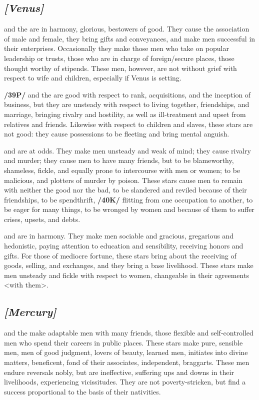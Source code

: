 \subsection{\textit{[Venus]}}
\Venus\xspace and the \Sun\xspace are in harmony, glorious, bestowers of good. They cause the association of male and female, they bring gifts and conveyances, and make men successful in their enterprises. Occasionally they make those men who take on popular leadership or trusts, those who are in charge of foreign/secure places, those thought worthy of stipends. These men, however, are not without grief with respect to wife and children, especially if Venus is setting.

\textbf{/39P/}\Venus\xspace and the \Moon\xspace are good with respect to rank, acquisitions, and the inception of business,
but they are unsteady with respect to living together, friendships, and marriage, bringing rivalry and hostility, as well as ill-treatment and upset from relatives and friends. Likewise with respect to children and slaves, these stars are not good: they cause possessions to be fleeting and bring mental anguish.

\Venus\xspace and \Mars\xspace are at odds. They make men unsteady and weak of mind; they cause rivalry and murder; they cause men to have many friends, but to be blameworthy, shameless, fickle, and equally prone to intercourse with men or women; to be malicious, and plotters of murder by poison. These stars cause men to remain with neither the good nor the bad, to be slandered and reviled because of their friendships, to
be spendthrift, \textbf{/40K/} flitting from one occupation to another, to be eager for many things, to be wronged by women and because of them to suffer crises, upsets, and debts.

\Venus\xspace and \Mercury\xspace are in harmony. They make men sociable and gracious, gregarious and hedonistic, paying attention to education and sensibility, receiving honors and gifts. For those of mediocre fortune, these stars bring about the receiving of goods, selling, and exchanges, and they bring a base livelihood. These stars make men unsteady and fickle with respect to women, changeable in their agreements <with
them>.

\secbr
{}
\subsection{\textit{[Mercury]}}
\Mercury\xspace and the \Sun\xspace make adaptable men with many friends, those flexible and self-controlled men who spend their careers in public places. These stars make pure, sensible men, men of good judgment, lovers of beauty, learned men, initiates into divine matters, beneficent, fond of their associates, independent, braggarts. These men endure reversals nobly, but are ineffective, suffering ups and downs in their
livelihoods, experiencing vicissitudes. They are not poverty-stricken, but find a success proportional to the basis of their nativities.

